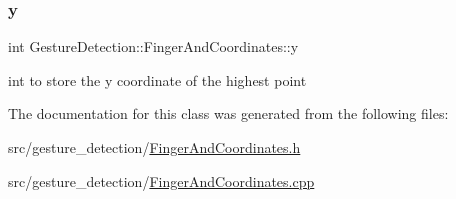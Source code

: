 \mbox{\label{classGestureDetection_1_1FingerAndCoordinates_a2e975227cf1ed24857600d35ee84e258}} 
\subsubsection{\texorpdfstring{y}{y}}
{\footnotesize\ttfamily int Gesture\+Detection\+::\+Finger\+And\+Coordinates\+::y}



int to store the y coordinate of the highest point 



The documentation for this class was generated from the following files\+:\begin{DoxyCompactItemize}
\item 
src/gesture\+\_\+detection/\hyperlink{FingerAndCoordinates_8h}{Finger\+And\+Coordinates.\+h}\item 
src/gesture\+\_\+detection/\hyperlink{FingerAndCoordinates_8cpp}{Finger\+And\+Coordinates.\+cpp}\end{DoxyCompactItemize}

